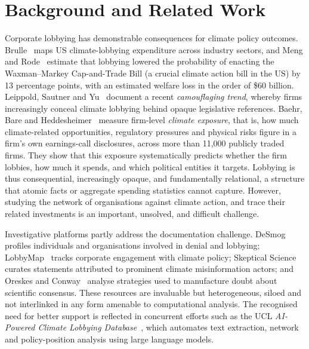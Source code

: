 \section{Background and Related Work}
\label{sec:related}

Corporate lobbying has demonstrable consequences for climate policy outcomes.
Brulle~\cite{brulle2018climate} maps US climate-lobbying expenditure across industry sectors, and Meng and Rode~\cite{meng2019social} estimate that lobbying lowered the probability of enacting the Waxman--Markey Cap-and-Trade Bill (a crucial climate action bill in the US) by 13 percentage points, with an estimated welfare loss in the order of \$60 billion.
Leippold, Sautner and Yu~\cite{leippold2024corporate} document a recent \emph{camouflaging trend}, whereby firms increasingly conceal climate lobbying behind opaque legislative references. %
Baehr, Bare and Heddesheimer~\cite{baehr2026climate} measure firm-level \emph{climate exposure}, that is, how much climate-related opportunities, regulatory pressures and physical risks figure in a firm's own earnings-call disclosures, across more than 11{,}000 publicly traded firms.
They show that this exposure systematically predicts whether the firm lobbies, how much it spends, and which political entities it targets.
Lobbying is thus consequential, increasingly opaque, and fundamentally relational, a structure that atomic facts or aggregate spending statistics cannot capture.
However, studying the network of organisations against climate action, and trace their related investments is an important, unsolved, and difficult challenge.

\begin{sloppypar}Investigative platforms partly address the documentation challenge.
DeSmog~\cite{desmog} profiles individuals and organisations involved in denial and lobbying;
LobbyMap~\cite{lobbymap} tracks corporate engagement with climate policy;
Skeptical Science~\cite{skepticalscience} curates statements attributed to prominent climate misinformation actors;
and Oreskes and Conway~\cite{oreskes2011merchants} analyse strategies used to manufacture doubt about scientific consensus.
These resources are invaluable but heterogeneous, siloed and not interlinked in any form amenable to computational analysis.
The recognised need for better support is reflected in concurrent efforts such as the UCL \emph{AI-Powered Climate Lobbying Database}~\cite{uclclimatelobbying}, which automates text extraction, network and policy-position analysis using large language models.\end{sloppypar}

